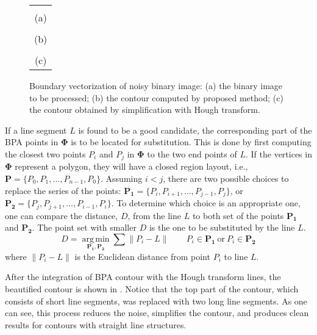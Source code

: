 \begin{figure*}[htbp]
\begin{center}
\begin{tabular}{c}
\fbox{\includegraphics[width=0.7\textwidth]
{aaa_image_slice_0529.png}} \\
(a) \\
\fbox{\includegraphics[width=0.7\textwidth]
{bbb_image_slice_1024_392_0533_refine_with_rad_1_and_merged.png}} \\
(b) \\
\fbox{\includegraphics[width=0.7\textwidth]
{bbb_image_slice_1024_392_0533_combine_HT_BPA_rad_32.png}} \\
(c)
\end{tabular}
\end{center}
\caption{Boundary vectorization of noisy binary image:
(a) the binary image to be processed;
(b) the contour computed by proposed method;
(c) the contour obtained by simplification with Hough transform.}
\label{fig:HT_BPA_figure}
\end{figure*}

If a line segment $L$ is found to be a good candidate,
the corresponding part of the BPA points in $\boldsymbol{\Phi}$
is to be located for substitution.
This is done by first computing the closest two points
$P_i$ and $P_j$ in $\boldsymbol{\Phi}$ to the two end points of $L$.
If the vertices in $\boldsymbol{\Phi}$ represent a polygon,
they will have a closed region layout,
i.e., $\boldsymbol{P} = \{ P_0,P_1,\ldots ,P_{n-1}, P_0 \}$.
Assuming $i < j$, there are two possible choices to replace
the series of the points:
$\boldsymbol{P_1} = \{ P_i,P_{i+1},\ldots,P_{j-1}, P_j \}$, or
$\boldsymbol{P_2} = \{ P_j,P_{j+1},\ldots,P_{i-1}, P_i \}$.
To determine which choice is an appropriate one,
one can compare the distance, $D$,
from the line $L$ to both set of the points
$\boldsymbol{P_1}$ and $\boldsymbol{P_2}$.
The point set with smaller $D$ is the one to be substituted by the line $L$.
\begin{equation*}
D = \underset{\boldsymbol{P_1},\boldsymbol{P_2}}{\operatorname{arg\,min}}
\sum{\lVert P_i - L \rVert}
\qquad P_i \in \boldsymbol{P_1} \ \text{or} \ P_i \in \boldsymbol{P_2}
\end{equation*}
where $\lVert P_i - L \rVert$ is the Euclidean distance
from point $P_i$ to line $L$.

After the integration of BPA contour with the Hough transform lines,
the beautified contour is shown in .
Notice that the top part of the contour,
which consists of short line segments,
was replaced with two long line segments.
As one can see, this process reduces the noise,
simplifies the contour,
and produces clean results
for contours with straight line structures.

